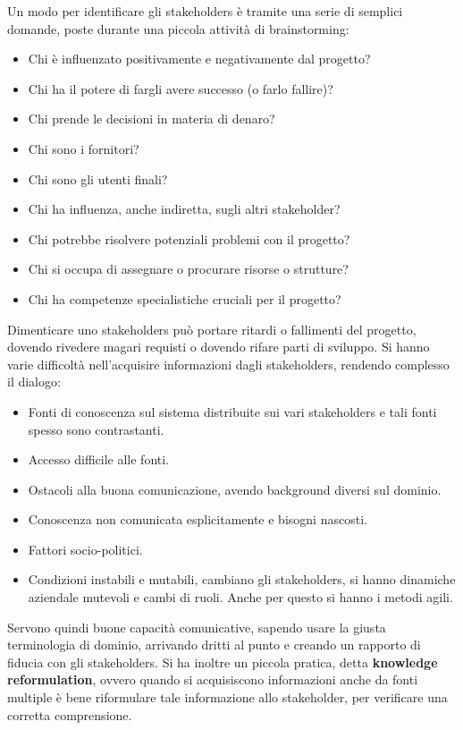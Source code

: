 Un modo per identificare gli stakeholders è tramite una serie di semplici
domande, poste durante una piccola attività di brainstorming:
\begin{itemize}
      \item Chi è influenzato positivamente e negativamente dal progetto?
      \item Chi ha il potere di fargli avere successo (o farlo fallire)?
      \item Chi prende le decisioni in materia di denaro?
      \item Chi sono i fornitori?
      \item Chi sono gli utenti finali?
      \item Chi ha influenza, anche indiretta, sugli altri stakeholder?
      \item Chi potrebbe risolvere potenziali problemi con il progetto?
      \item Chi si occupa di assegnare o procurare risorse o strutture?
      \item Chi ha competenze specialistiche cruciali per il progetto?
\end{itemize}
Dimenticare uno stakeholders può portare ritardi o fallimenti del progetto,
dovendo rivedere magari requisti o dovendo rifare parti di sviluppo. Si hanno
varie difficoltà nell'acquisire informazioni dagli stakeholders, rendendo
complesso il dialogo:
\begin{itemize}
      \item Fonti di conoscenza sul sistema distribuite sui vari stakeholders e
            tali fonti spesso sono contrastanti.
      \item Accesso difficile alle fonti.
      \item Ostacoli alla buona comunicazione, avendo background diversi sul
            dominio.
      \item Conoscenza non comunicata esplicitamente e bisogni nascosti.
      \item Fattori socio-politici.
      \item Condizioni instabili e mutabili, cambiano gli stakeholders, si hanno
            dinamiche aziendale mutevoli e cambi di ruoli. Anche per questo si
            hanno i metodi agili.
\end{itemize}
Servono quindi buone capacità comunicative, sapendo usare la giusta terminologia
di dominio, arrivando dritti al punto e creando un rapporto di fiducia con gli
stakeholders. Si ha inoltre un piccola pratica, detta \textbf{knowledge reformulation},
ovvero quando si acquisiscono informazioni anche da fonti multiple è bene
riformulare tale informazione allo stakeholder, per verificare una corretta
comprensione.

